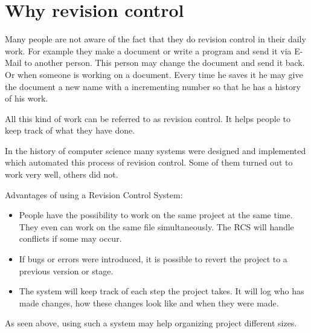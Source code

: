 \section{Why revision control}\label{whyrevisioncontrol}

\cite[Chapter 1]{hgbook2009}

Many people are not aware of the fact that they do revision control in their daily work. For example they make a document or write a program and send it via E-Mail to another person. This person may change the document and send it back. Or when someone is working on a document. Every time he saves it he may give the document a new name with a incrementing number so that he has a history of his work.

All this kind of work can be referred to as revision control. It helps people to keep track of what they have done.

In the history of computer science many systems were designed and implemented which automated this process of revision control. Some of them turned out to work very well, others did not.

Advantages of using a Revision Control System:
\begin{itemize}
\item People have the possibility to work on the same project at the same time. They even can work on the same file simultaneously. The RCS will handle conflicts if some may occur.
\item If bugs or errors were introduced, it is possible to revert the project to a previous version or stage.
\item The system will keep track of each step the project takes. It will log who has made changes, how these changes look like and when they were made.
\end{itemize}

As seen above, using such a system may help organizing project different sizes.
